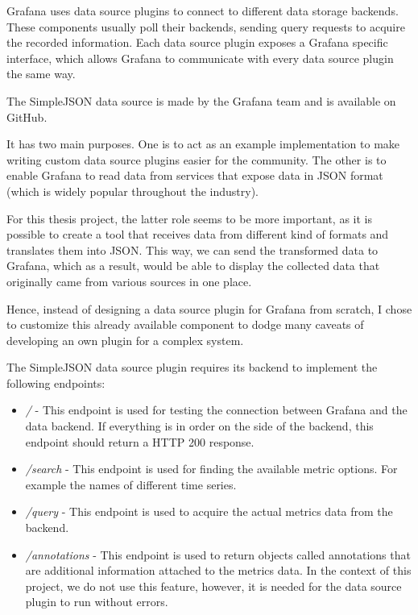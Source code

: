 Grafana uses data source plugins to connect to different data storage backends. These components usually poll their backends, sending query requests to acquire the recorded information. Each data source plugin exposes a Grafana specific interface, which allows Grafana to communicate with every data source plugin the same way.

The SimpleJSON data source is made by the Grafana team and is available on GitHub. \cite{simple-json-datasource}

It has two main purposes. One is to act as an example implementation to make writing custom data source plugins easier for the community. The other is to enable Grafana to read data from services that expose data in JSON format (which is widely popular throughout the industry).

For this thesis project, the latter role seems to be more important, as it is possible to create a tool that receives data from different kind of formats and translates them into JSON. This way, we can send the transformed data to Grafana, which as a result, would be able to display the collected data that originally came from various sources in one place.

Hence, instead of designing a data source plugin for Grafana from scratch, I chose to customize this already available component to dodge many caveats of developing an own plugin for a complex system.

The SimpleJSON data source plugin requires its backend to implement the following endpoints:

\begin{itemize}
	\item \emph{/} - This endpoint is used for testing the connection between Grafana and the data backend. If everything is in order on the side of the backend, this endpoint should return a HTTP 200 response.
	\item \emph{/search} - This endpoint is used for finding the available metric options. For example the names of different time series.
	\item \emph{/query} - This endpoint is used to acquire the actual metrics data from the backend.
	\item \emph{/annotations} - This endpoint is used to return objects called annotations that are additional information attached to the metrics data. In the context of this project, we do not use this feature, however, it is needed for the data source plugin to run without errors.
\end{itemize}

